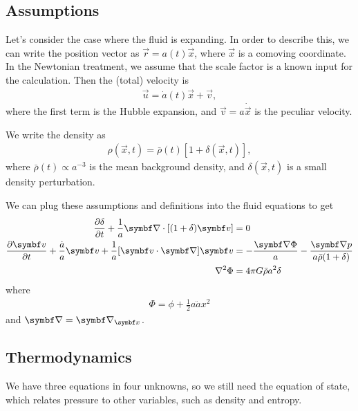 \subsection*{Assumptions}

Let's consider the case where the fluid is expanding. In order to describe this, we can write the position vector as $\vec{r} = a(t) \vec{x}$, where $\vec{x}$ is a comoving coordinate. In the Newtonian treatment, we assume that the scale factor is a known input for the calculation. Then the (total) velocity is
\begin{align*}
	\vec{u} = \dot{a}(t) \vec{x} + \vec{v},
\end{align*}
where the first term is the Hubble expansion, and $\vec{v} = a \dot{\vec{x}}$ is the peculiar velocity.

We write the density as
\begin{align*}
	\rho(\vec{x},t) = \bar{\rho}(t) [1 + \delta(\vec{x}, t)],
\end{align*}
where $\bar{\rho}(t) \propto a^{-3}$ is the mean background density, and $\delta(\vec{x}, t)$ is a small density perturbation.

We can plug these assumptions and definitions into the fluid equations to get
\begin{align*}
	\pdv{\delta}{t} + \frac{1}{a} \Div[(1+\delta)\vec{v}]
	&= 0\\
	\pdv{\vec{v}}{t} + \frac{\dot{a}}{a} \vec{v} + \frac{1}{a} [\vec{v} \cdot \Grad] \vec{v}
	&= - \frac{\Grad \Phi}{a} - \frac{\Grad p}{a \bar{\rho}(1+\delta)}\\
	\Lap \Phi
	&= 4 \pi G \bar{\rho} a^2 \delta
\end{align*}
where
\begin{align*}
	\Phi = \phi + \frac{1}{2} a \ddot{a} x^2 
\end{align*}
and $\Grad = \Grad_{\vec{x}}$.

\subsection*{Thermodynamics}

We have three equations in four unknowns, so we still need the equation of state, which relates pressure to other variables, such as density and entropy. 

